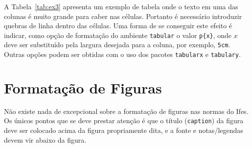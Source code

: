 \documentclass[12pt,times,a4paper,english,brazil,
chapter=TITLE,section=TITLE,subsection=TITLE]{ifes7}
\begin{document}
\begin{table}[h]
\end{table}

A Tabela~\ref{tab:ex3} apresenta um exemplo de tabela onde o texto em
uma das colunas é muito grande para caber nas células. Portanto é
necessário introduzir quebras de linha dentro das células. Uma forma
de se conseguir este efeito é indicar, como opção de formatação do
ambiente \texttt{tabular} o valor \verb!p{x}!, onde $x$ deve ser
substituído pela largura desejada para a coluna, por exemplo,
\texttt{5cm}. Outras opções podem ser obtidas com o uso dos pacotes
\texttt{tabularx} e \texttt{tabulary}.



\section{Formatação de Figuras}
\label{sec:format-figuras}

Não existe nada de excepcional sobre a formatação de figuras nas
normas do Ifes. Os únicos pontos que se deve prestar atenção é que o
título (\texttt{caption}) da figura deve ser colocado acima da figura
propriamente dita, e a fonte e notas/legendas devem vir abaixo da
figura.
\end{document}
